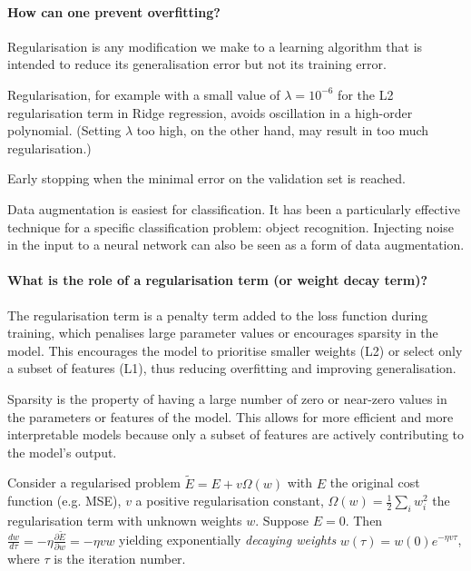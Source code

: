 \paragraph{How can one prevent overfitting?}

Regularisation is any modification we make to a learning algorithm that is intended to reduce its generalisation error but not its training error.

Regularisation, for example with a small value of $\lambda = 10^{-6}$
for the L2 regularisation term in Ridge regression,
avoids oscillation in a high-order polynomial.
(Setting $\lambda$ too high, on the other hand, may result in too much regularisation.)

Early stopping when the minimal error on the validation set is reached.

Data augmentation is easiest for classification.
It has been a particularly effective technique for a specific classification problem: object recognition.
Injecting noise in the input to a neural network \citep{SIETSMA199167} can also be seen as a form of data augmentation.

\paragraph{What is the role of a regularisation term (or weight decay term)?}

The regularisation term is a penalty term added to the loss function
during training, which penalises large parameter values or
encourages sparsity in the model. This encourages the model to prioritise
smaller weights (L2) or select only a subset of features (L1), thus
reducing overfitting and improving generalisation.

Sparsity is the property of having a large number of zero or near-zero
values in the parameters or features of the model.
This allows for more efficient and more interpretable models because only
a subset of features are actively contributing to the model's output.

Consider a regularised problem $\tilde{E} = E + v \Omega(w)$
with $E$ the original cost function (e.g. MSE),
$v$ a positive regularisation constant,
$\Omega(w) = \frac{1}{2} \sum_i{w_i^2}$ the regularisation term
with unknown weights $w$.
Suppose $E = 0$. Then $\frac{dw}{d \tau} = - \eta \frac{\partial \tilde{E}}{\partial w} = - \eta v w$
yielding exponentially \textit{decaying weights} $w(\tau) = w(0) e^{- \eta v \tau}$,
where $\tau$ is the iteration number.

